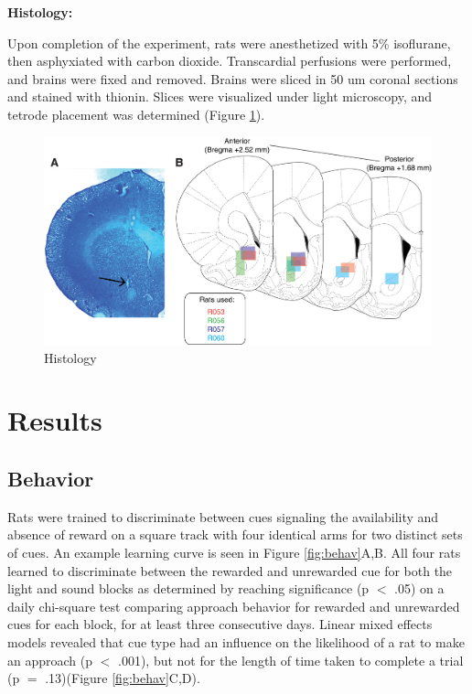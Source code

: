 \documentclass[11pt]{article}
\begin{document}
{\bf Histology:}

Upon completion of the experiment, rats were anesthetized with 5\% isoflurane, then asphyxiated with carbon dioxide. Transcardial perfusions were performed, and brains were fixed and removed. Brains were sliced in 50 um coronal sections and stained with thionin. Slices were visualized under light microscopy, and tetrode placement was determined (Figure \ref{fig:histo}).

\begin{figure}[h]
\centering
\includegraphics[width=\textwidth]{Fig 3 - Histology.png}
\caption{Histology}
\label{fig:histo}
\end{figure}

\section*{Results}

\subsection*{Behavior}

Rats were trained to discriminate between cues signaling the availability and absence of reward on a square track with four identical arms for two distinct sets of cues. An example learning curve is seen in Figure \ref{fig:behav}A,B. All four rats learned to discriminate between the rewarded and unrewarded cue for both the light and sound blocks as determined by reaching significance (p $<$ .05) on a daily chi-square test comparing approach behavior for rewarded and unrewarded cues for each block, for at least three consecutive days. Linear mixed effects models revealed that cue type had an influence on the likelihood of a rat to make an approach (p $<$ .001), but not for the length of time taken to complete a trial (p $=$ .13)(Figure \ref{fig:behav}C,D).
\end{document}
